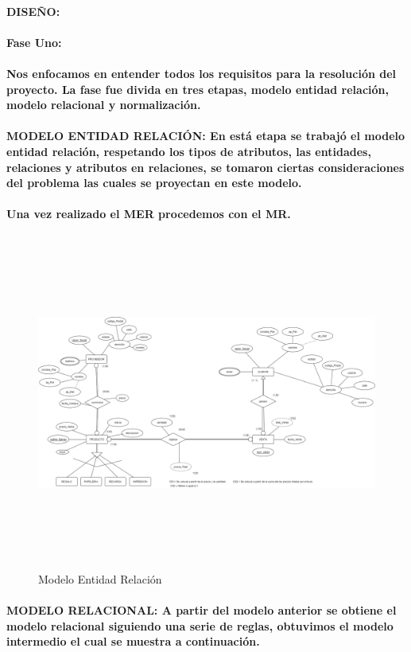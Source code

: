 \documentclass{article}
\begin{document}
	 \paragraph{DISEÑO:}
	\paragraph{Fase Uno:\\\\
	Nos enfocamos en entender todos los requisitos para la resolución del proyecto. La fase fue divida en tres etapas, modelo entidad relación, modelo relacional y normalización.\\\\
	MODELO ENTIDAD RELACIÓN: En está etapa se trabajó el modelo entidad relación, respetando los tipos de atributos, las entidades, relaciones y atributos en relaciones, se tomaron ciertas consideraciones del problema las cuales se proyectan en este modelo. }
    \paragraph{Una vez realizado el MER procedemos con el MR.}
     \begin{figure}[h]
	     \centering
	   \includegraphics[height= 11cm, width=17cm]{MER1.png}
	   \caption{Modelo Entidad Relación}
	     \label{MER}
	 \end{figure}
	 \paragraph{MODELO RELACIONAL: A partir del modelo anterior se obtiene el modelo relacional siguiendo una serie de reglas, obtuvimos el modelo intermedio el cual se muestra a continuación. }
\end{document}
